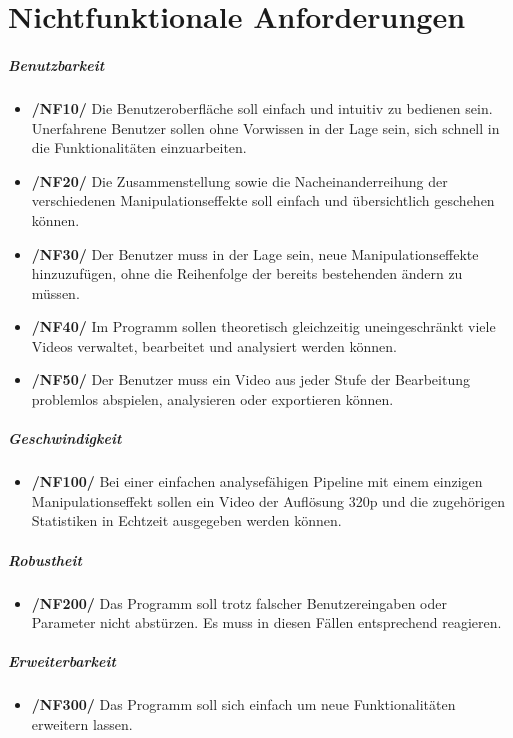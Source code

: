 \section{Nichtfunktionale Anforderungen}

\subparagraph{Benutzbarkeit}
\begin{itemize}
	\item \textbf{/NF10/} Die Benutzeroberfläche soll einfach und intuitiv zu bedienen sein. Unerfahrene Benutzer sollen ohne Vorwissen in der Lage sein, sich schnell in die Funktionalitäten einzuarbeiten.
	\item \textbf{/NF20/} Die Zusammenstellung sowie die Nacheinanderreihung der verschiedenen Manipulationseffekte soll einfach und übersichtlich geschehen können. 
	\item \textbf{/NF30/} Der Benutzer muss in der Lage sein, neue Manipulationseffekte hinzuzufügen, ohne die Reihenfolge der bereits bestehenden ändern zu müssen.
	\item \textbf{/NF40/} Im Programm sollen theoretisch gleichzeitig uneingeschränkt viele Videos verwaltet, bearbeitet und analysiert werden können.
	\item \textbf{/NF50/} Der Benutzer muss ein Video aus jeder Stufe der Bearbeitung problemlos abspielen, analysieren oder exportieren können.
\end{itemize}

\subparagraph{Geschwindigkeit}

\begin{itemize}
	\item \textbf{/NF100/} Bei einer einfachen analysefähigen Pipeline mit einem einzigen Manipulationseffekt sollen ein Video der Auflösung 320p und die zugehörigen Statistiken in Echtzeit ausgegeben werden können.
\end{itemize}

\subparagraph{Robustheit}

\begin{itemize}
	\item \textbf{/NF200/} Das Programm soll trotz falscher Benutzereingaben oder Parameter nicht abstürzen. Es muss in diesen Fällen entsprechend reagieren.
\end{itemize}

\subparagraph{Erweiterbarkeit}

\begin{itemize}
	\item \textbf{/NF300/} Das Programm soll sich einfach um neue Funktionalitäten erweitern lassen.
\end{itemize}

 
